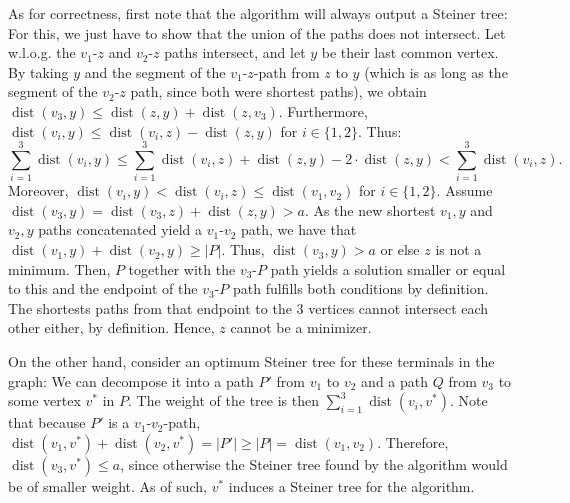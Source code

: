 \documentclass[oneside,a4paper]{amsart}
\DeclareMathOperator{\dist}{dist}
\begin{document}
As for correctness, first note that the algorithm will always output a Steiner tree: For this, we just have to show that the union of the paths does not intersect. Let w.l.o.g. the $v_1$-$z$ and $v_2$-$z$ paths intersect, and let $y$ be their last common vertex. By taking $y$ and the segment of the $v_1$-$z$-path from $z$ to $y$ (which is as long as the segment of the $v_2$-$z$ path, since both were shortest paths), we obtain $\dist(v_3, y) \leq \dist(z, y) + \dist(z, v_3)$. Furthermore, $\dist(v_i, y) \leq \dist(v_i, z) - \dist(z, y)$ for $i \in \{ 1, 2\}$. Thus:
\[
	\sum_{i=1}^3 \dist(v_i, y) \leq \sum_{i=1}^3 \dist(v_i, z) + \dist(z, y) - 2 \cdot \dist(z, y) < \sum_{i=1}^3 \dist(v_i, z).
\]
Moreover, $\dist(v_i, y) < \dist(v_i, z) \leq \dist(v_1, v_2)$ for $i \in \{ 1, 2\}$. Assume $\dist(v_3, y) = \dist(v_3, z) + \dist(z, y) > a$. As the new shortest $v_1, y$ and $v_2, y$ paths concatenated yield a $v_1$-$v_2$ path, we have that $\dist(v_1, y) + \dist(v_2, y) \geq |P|$. Thus, $\dist(v_3, y) > a$ or else $z$ is not a minimum. Then, $P$ together with the $v_3$-$P$ path yields a solution smaller or equal to this and the endpoint of the $v_3$-$P$ path fulfills both conditions by definition. The shortests paths from that endpoint to the 3 vertices cannot intersect each other either, by definition. Hence, $z$ cannot be a minimizer.

On the other hand, consider an optimum Steiner tree for these terminals in the graph: We can decompose it into a path $P'$ from $v_1$ to $v_2$ and a path $Q$ from $v_3$ to some vertex $v^*$ in $P$. The weight of the tree is then $\sum_{i=1}^3 \dist(v_i, v^*)$. Note that because $P'$ is a $v_1$-$v_2$-path, $\dist(v_1, v^*) + \dist(v_2, v^*) = |P'| \geq |P| = \dist(v_1, v_2)$. Therefore, $\dist(v_3, v^*) \leq a$, since otherwise the Steiner tree found by the algorithm would be of smaller weight. As of such, $v^*$ induces a Steiner tree for the algorithm.
\end{document}
